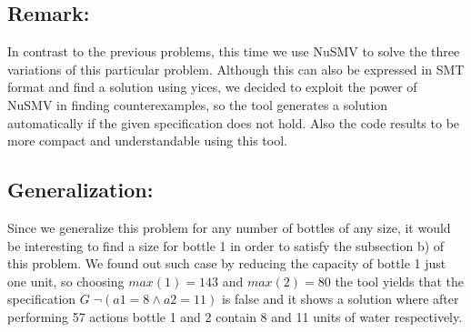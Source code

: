 \subsection*{Remark:}
In contrast to the previous problems, this time we use NuSMV to solve the three variations of this particular problem. Although this can also be expressed in SMT format and find a solution using yices, we decided to exploit the power of NuSMV in finding counterexamples, so the tool generates a solution automatically if the given specification does not hold. Also the code results to be more compact and understandable using this tool.

\subsection*{Generalization:}
Since we generalize this problem for any number of bottles of any size, it would be interesting to find a size for bottle 1 in order to satisfy the subsection b) of this problem. We found out such case by reducing the capacity of bottle 1 just one unit, so choosing $max(1)=143$ and $max(2)=80$ the tool yields that the specification $G\;\neg(a1 = 8 \wedge a2 = 11)$ is false and it shows a solution where after performing 57 actions bottle 1 and 2 contain 8 and 11 units of water respectively.  